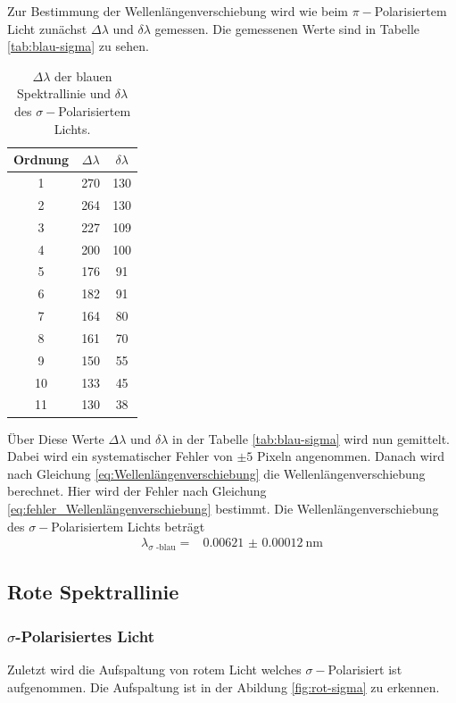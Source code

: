 Zur Bestimmung der Wellenlängenverschiebung wird wie beim $\pi -$Polarisiertem Licht zunächst $\Delta \lambda$ und $\delta \lambda$ gemessen.
Die gemessenen Werte sind in Tabelle \autoref{tab:blau-sigma} zu sehen.

\begin{table}
    \centering
    \caption{$\Delta \lambda$ der blauen Spektrallinie und $\delta \lambda$ des $\sigma -$Polarisiertem Lichts.}
    \begin{tabular}{ccc}
        \toprule
        Ordnung & $\Delta \lambda$ & $\delta \lambda $  \\
        \midrule
        1   &   270  &    130   \\
        2   &   264  &    130   \\
        3   &   227  &    109   \\
        4   &   200  &    100   \\
        5   &   176  &    91    \\
        6   &   182  &    91    \\
        7   &   164  &    80    \\
        8   &   161  &    70    \\
        9   &   150  &    55    \\
        10  &   133  &    45    \\
        11  &   130  &    38    \\
        \bottomrule
    \end{tabular}
    \label{tab:blau-sigma}
\end{table}

Über Diese Werte $\Delta \lambda$ und $\delta \lambda$ in der Tabelle \autoref{tab:blau-sigma} wird nun gemittelt.
Dabei wird ein systematischer Fehler von $\pm 5$ Pixeln angenommen. 
Danach wird nach Gleichung \eqref{eq:Wellenlängenverschiebung} die Wellenlängenverschiebung berechnet.
Hier wird der Fehler nach Gleichung \eqref{eq:fehler_Wellenlängenverschiebung} bestimmt.
Die Wellenlängenverschiebung des $\sigma -$Polarisiertem Lichts beträgt
\begin{align*}
    \lambda _\text{$\sigma$ -blau} =& \SI{0.00621(012)}{\nano\meter}
\end{align*}

\subsection{Rote Spektrallinie}
\subsubsection{\texorpdfstring{$\sigma$}{\textsigma}-Polarisiertes Licht}
Zuletzt wird die Aufspaltung von rotem Licht welches $\sigma -$Polarisiert ist aufgenommen.
Die Aufspaltung ist in der Abildung \autoref{fig:rot-sigma} zu erkennen.

